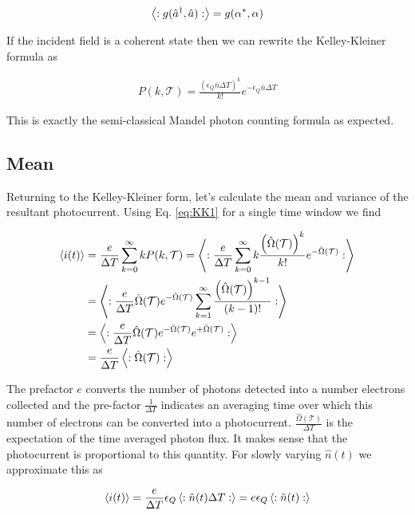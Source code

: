 \documentclass[12pt]{article}
\newcommand{\ep}{\epsilon}
\newcommand{\mc}[1]{\mathcal{#1}}
\begin{document}
\begin{align}
\Braket{:g(\hat{a}^{\dag},\hat{a}):} = g(\alpha^*,\alpha)
\end{align}

If the incident field is a coherent state then we can rewrite the Kelley-Kleiner formula as

\begin{align}
P(k,\mc{T}) = \frac{\left(\ep_Q \bar{n} \Delta T\right)^k}{k!} e^{-\ep_Q \bar{n}\Delta T}
\end{align}

This is exactly the semi-classical Mandel photon counting formula as expected.

\subsection{Mean}

Returning to the Kelley-Kleiner form, let's calculate the mean and variance of the resultant photocurrent. Using Eq. \eqref{eq:KK1} for a single time window we find

\begin{align}
\Braket{i(t)} &= \frac{e}{\Delta T} \sum_{k=0}^{\infty} k P(k,\mc{T}) = \Braket{:\frac{e}{\Delta T} \sum_{k=0}^{\infty} k\frac{\left(\hat{\Omega}(\mc{T})\right)^k}{k!} e^{-\hat{\Omega}(\mc{T})}:}\\
&= \Braket{:\frac{e}{\Delta T} \hat{\Omega}(\mc{T}) e^{-\hat{\Omega}(\mc{T})}\sum_{k=1}^{\infty} \frac{\left(\hat{\Omega}(\mc{T})\right)^{k-1}}{(k-1)!}:}\\
&= \Braket{:\frac{e}{\Delta T} \hat{\Omega}(\mc{T}) e^{-\hat{\Omega}(\mc{T})} e^{+\hat{\Omega}(\mc{T})}:}\\
& = \frac{e}{\Delta T}\Braket{:\hat{\Omega}(\mc{T}):}\\
\end{align}

The prefactor $e$ converts the number of photons detected into a number electrons collected and the pre-factor $\frac{1}{\Delta T}$ indicates an averaging time over which this number of electrons can be converted into a photocurrent.
$\frac{\hat{\Omega}(\mc{T})}{\Delta T}$ is the expectation of the time averaged photon flux. It makes sense that the photocurrent is proportional to this quantity. For slowly varying $\hat{n}(t)$ we approximate this as

\begin{align}
\Braket{i(t)} = \frac{e}{\Delta T} \ep_Q \Braket{:\hat{n}(t) \Delta T:} = e \ep_Q \Braket{:\hat{n}(t):}
\end{align}
\end{document}
